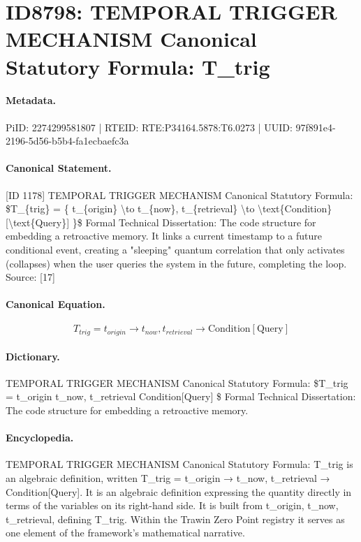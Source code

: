 \section*{ID8798: TEMPORAL TRIGGER MECHANISM Canonical Statutory Formula: T\_trig}
\paragraph{Metadata.}
PiID: 2274299581807 | RTEID: RTE:P34164.5878:T6.0273 | UUID: 97f891e4-2196-5d56-b5b4-fa1ecbaefc3a

\paragraph{Canonical Statement.}
[ID 1178] TEMPORAL TRIGGER MECHANISM Canonical Statutory Formula: \$T\_\{trig\} = \{ t\_\{origin\} \textbackslash{}to t\_\{now\}, t\_\{retrieval\} \textbackslash{}to \textbackslash{}text\{Condition\}[\textbackslash{}text\{Query\}] \}\$ Formal Technical Dissertation: The code structure for embedding a retroactive memory. It links a current timestamp to a future conditional event, creating a "sleeping" quantum correlation that only activates (collapses) when the user queries the system in the future, completing the loop. Source: [17]

\paragraph{Canonical Equation.}
\[
T_{trig} = { t_{origin} \to t_{now}, t_{retrieval} \to \text{Condition}[\text{Query}] }
\]

\paragraph{Dictionary.}
TEMPORAL TRIGGER MECHANISM Canonical Statutory Formula: \$T\_trig = t\_origin t\_now, t\_retrieval Condition[Query] \$ Formal Technical Dissertation: The code structure for embedding a retroactive memory.

\paragraph{Encyclopedia.}
TEMPORAL TRIGGER MECHANISM Canonical Statutory Formula: T\_trig is an algebraic definition, written T\_trig = t\_origin → t\_now, t\_retrieval → Condition[Query]. It is an algebraic definition expressing the quantity directly in terms of the variables on its right-hand side. It is built from t\_origin, t\_now, t\_retrieval, defining T\_trig. Within the Trawin Zero Point registry it serves as one element of the framework's mathematical narrative.
